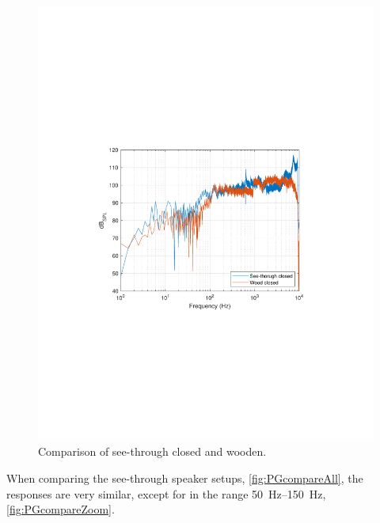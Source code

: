 \begin{figure}
	\centering
	\includegraphics[width=0.7\linewidth, clip, trim={3.9cm 8.4cm 4.5cm 9cm}]{gfx/SpeakerMeas/ClosedCompare.pdf}
	\caption{Comparison of see-through closed and wooden.}
	\label{fig:closedcompare}
\end{figure}

When comparing the see-through speaker setups, \cref{fig:PGcompareAll}, the responses are very similar, except for in the range \SIrange{50}{150}{\hertz}, \cref{fig:PGcompareZoom}. 

